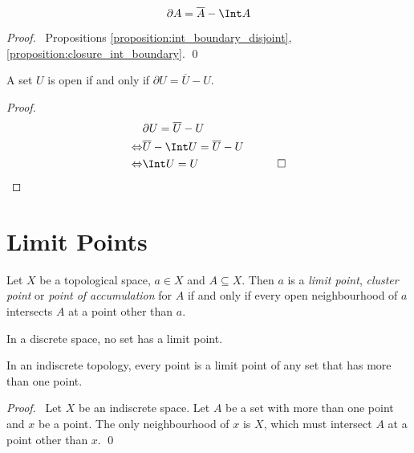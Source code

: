 \begin{proposition}
    \[ \partial A = \overline{A} - \Int A \]
\end{proposition}

\begin{proof}
    \pf\ Propositions \ref{proposition:int_boundary_disjoint}, \ref{proposition:closure_int_boundary}. \qed
\end{proof}

\begin{corollary}
    A set $U$ is open if and only if $\partial U = \overline{U} - U$.
\end{corollary}

\begin{proof}
    \pf
    \begin{align*}
        & \partial U = \overline{U} - U \\
        \Leftrightarrow & \overline{U} - \Int U = \overline{U} - U \\
        \Leftrightarrow & \Int U = U & \qed
    \end{align*}
\end{proof}

\section{Limit Points}

\begin{definition}
    Let $X$ be a topological space, $a \in X$ and $A \subseteq X$. Then $a$ is a \emph{limit point},
    \emph{cluster point} or \emph{point of accumulation} for $A$ if and only if every open neighbourhood of $a$
    intersects $A$ at a point other than $a$.
\end{definition}

\begin{proposition}
    In a discrete space, no set has a limit point.
\end{proposition}

\begin{proposition}
    \label{proposition:indiscrete_limit_point}
    In an indiscrete topology, every point is a limit point of any set that has more than one point.
\end{proposition}

\begin{proof}
    \pf\ Let $X$ be an indiscrete space. Let $A$ be a set with more than one point and $x$ be a point.
    The only neighbourhood of $x$ is $X$, which must intersect $A$ at a point other than $x$. \qed
\end{proof}

